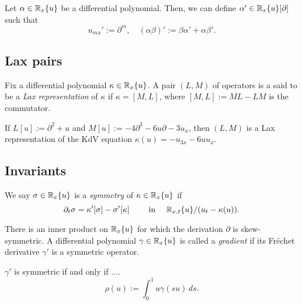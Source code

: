 \documentclass{../../../small}
\begin{document}
\begin{prb}
Let $\alpha\in\mathbb{R}_x\{u\}$ be a differential polynomial.
Then, we can define $\alpha'\in\mathbb{R}_x\{u\}[\partial]$ such that
\[u_{mx}':=\partial^m,\quad(\alpha\beta)':=\beta\alpha'+\alpha\beta'.\]
\end{prb}



\subsection*{Lax pairs}

\begin{prb}
Fix a differential polynomial $\kappa\in\mathbb{R}_x\{u\}$.
A pair $(L,M)$ of operators is a said to be a \emph{Lax representation} of $\kappa$ if $\kappa=[M,L]$, where $[M,L]:=ML-LM$ is the commutator.
\begin{parts}
\item If $L[u]:=\partial^2+u$ and $M[u]:=-4\partial^3-6u\partial-3u_x$, then $(L,M)$ is a Lax representation of the KdV equation $\kappa(u)=-u_{3x}-6uu_x$.
\end{parts}
\end{prb}


\begin{prb}

\end{prb}



\subsection*{Invariants}

\begin{prb}[Symmetry]
We say $\sigma\in\mathbb{R}_x\{u\}$ is a \emph{symmetry} of $\kappa\in\mathbb{R}_x\{u\}$ if
\[\partial_t\sigma=\kappa'[\sigma]-\sigma'[\kappa]\qquad\text{ in }\quad\mathbb{R}_{x,t}\{u\}/(u_t-\kappa(u)).\]

\end{prb}

\begin{prb}[Gradient]
There is an inner product on $\mathbb{R}_x\{u\}$ for which the derivation $\partial$ is skew-symmetric.
A differential polynomial $\gamma\in\mathbb{R}_x\{u\}$ is called a \emph{gradient} if its Fr\'echet derivative $\gamma'$ is a symmetric operator.
\begin{parts}
\item $\gamma'$ is symmetric if and only if ....
\[\rho(u):=\int_0^1u\gamma(su)\,ds.\]
\end{parts}
\end{prb}
\end{document}
